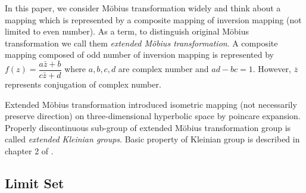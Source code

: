 In this paper, we consider M\"obius transformation widely and
think about a mapping which is represented by a composite mapping of
inversion mapping (not limited to even number).
As a term, to distinguish original M\"obius transformation
we call them \textit{extended M\"obius transformation}.
A composite mapping composed of odd number of inversion mapping
is represented by $f(z)=\dfrac{a{\bar{z}}+b}{c{\bar{z}}+d}$ where
$a, b, c, d$ are complex number and $ad-bc = 1$.
However, $\overline{z}$ represents conjugation of complex number.

Extended M\"obius transformation introduced isometric mapping (not
necessarily preserve direction) on three-dimensional hyperbolic space by
poincare expansion.
Properly discontinuous sub-group of extended M\"obius transformation group
is called \textit{extended Kleinian groups}.
Basic property of Kleinian group is described in chapter 2 of \cite{marden_2016}.

\subsection{Limit Set}

